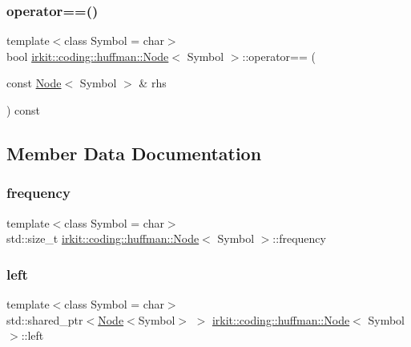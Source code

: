 \subsubsection{\texorpdfstring{operator==()}{operator==()}}
{\footnotesize\ttfamily template$<$class Symbol = char$>$ \\
bool \mbox{\hyperlink{structirkit_1_1coding_1_1huffman_1_1Node}{irkit\+::coding\+::huffman\+::\+Node}}$<$ Symbol $>$\+::operator== (\begin{DoxyParamCaption}\item[{const \mbox{\hyperlink{structirkit_1_1coding_1_1huffman_1_1Node}{Node}}$<$ Symbol $>$ \&}]{rhs }\end{DoxyParamCaption}) const\hspace{0.3cm}{\ttfamily [inline]}}



\subsection{Member Data Documentation}
\mbox{\label{structirkit_1_1coding_1_1huffman_1_1Node_ab341b30efdae2959eca6981cd61cab8f}} 
\subsubsection{\texorpdfstring{frequency}{frequency}}
{\footnotesize\ttfamily template$<$class Symbol = char$>$ \\
std\+::size\+\_\+t \mbox{\hyperlink{structirkit_1_1coding_1_1huffman_1_1Node}{irkit\+::coding\+::huffman\+::\+Node}}$<$ Symbol $>$\+::frequency}

\mbox{\label{structirkit_1_1coding_1_1huffman_1_1Node_a55539247b4f143527f03300bce3b0825}} 
\subsubsection{\texorpdfstring{left}{left}}
{\footnotesize\ttfamily template$<$class Symbol = char$>$ \\
std\+::shared\+\_\+ptr$<$\mbox{\hyperlink{structirkit_1_1coding_1_1huffman_1_1Node}{Node}}$<$Symbol$>$ $>$ \mbox{\hyperlink{structirkit_1_1coding_1_1huffman_1_1Node}{irkit\+::coding\+::huffman\+::\+Node}}$<$ Symbol $>$\+::left}

